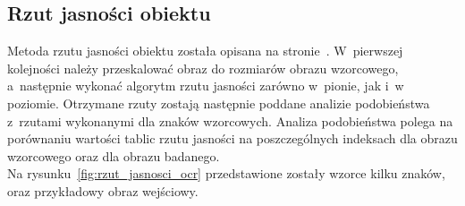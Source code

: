 \subsection{Rzut jasności obiektu}
Metoda rzutu jasności obiektu została opisana na stronie~\pageref{ssec:rzut_jasnosci}. W~pierwszej kolejności należy przeskalować obraz do rozmiarów obrazu wzorcowego, a~następnie wykonać algorytm rzutu jasności zarówno w~pionie, jak i~w poziomie. Otrzymane rzuty zostają następnie poddane analizie podobieństwa z~rzutami wykonanymi dla znaków wzorcowych. Analiza podobieństwa polega na porównaniu wartości tablic rzutu jasności na poszczególnych indeksach dla obrazu wzorcowego oraz dla obrazu badanego. \\
Na rysunku~\ref{fig:rzut_jasnosci_ocr} przedstawione zostały wzorce kilku znaków, oraz przykładowy obraz wejściowy.

